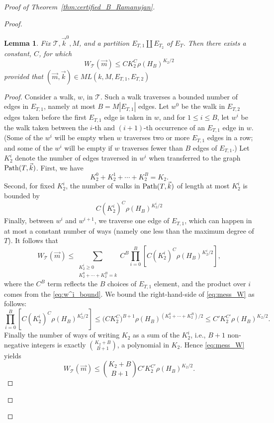 \documentclass{memo-l}
\theoremstyle{plain}
\theoremstyle{definition}
\numberwithin{section}{chapter}
\numberwithin{equation}{chapter}
\theoremstyle{plain}
\newtheorem{lem}[theorem]{Lemma}
\theoremstyle{definition}
\newcommand\cT{\mathcal{T}}
\begin{document}
\begin{proof}[Proof of Theorem~\ref{thm:certified_B_Ramanujan}]
\begin{proof}
\begin{lem}\label{le:crucial_walk_bound}
Fix $\cT,\vec k^0,M$, and a partition $E_{T,1}\amalg E_{T_2}$
of $E_T$.  Then there exists a constant, $C$, for which $$ W_\cT(\vec m)
\leq C K_2^C \rho(H_B)^{K_2/2} $$ provided that $(\vec m,\vec k)\in
ML(k,M,E_{T,1},E_{T,2})$ \end{lem} \begin{proof} Consider a walk, $w$, in
$\cT$.  Such a walk traverses a bounded number of edges in $E_{T,1}$,
namely at most $B=M |E_{T,1}|$ edges.  Let $w^0$ be the walk in $E_{T,2}$
edges taken before the first $E_{T,1}$ edge is taken in $w$, and for $1\leq
i\leq B$, let $w^i$ be the walk taken between the $i$-th and $(i+1)$-th
occurrence of an $E_{T,1}$ edge in $w$.  (Some of the $w^i$ will be empty
when $w$ traverses two or more $E_{T,1}$ edges in a row; and some of the
$w^i$ will be empty if $w$ traverses fewer than $B$ edges of $E_{T,1}$.)
Let $K_2^i$ denote the number of edges traversed in $w^i$ when transferred
to the graph ${\rm Path}(T,\vec k)$.  First, we have $$ K_2^0 + K_2^1 +
\cdots  + K_2^B  = K_2.  $$ Second, for fixed $K_2^i$, the number of walks
in ${\rm Path}(T,\vec k)$ of length at most $K_2^i$ is bounded by
\begin{equation}\label{eq:w^i_bound} C (K_2^i)^C \rho(H_B)^{K_2^i/2}
\end{equation} Finally, between $w^i$ and $w^{i+1}$, we traverse one edge
of $E_{T,1}$, which can happen in at most a constant number of ways (namely
one less than the maximum degree of $T$).  It follows that
\begin{equation}\label{eq:mess_W} W_\cT(\vec m) \leq \sum_{\substack{
K_2^i\geq 0 \\ K_2^0+\cdots+K_2^B = k} } C^B \prod_{i=0}^B [ C(K_2^i)^C
\rho(H_B)^{K_2^i/2} ] , \end{equation} where the $C^B$ term reflects the $B$
choices of $E_{T,1}$ element, and the product over $i$ comes from the
\eqref{eq:w^i_bound}.  We bound the right-hand-side of \eqref{eq:mess_W} as
follows: $$ \prod_{i=0}^B [ C(K_2^i)^C \rho(H_B)^{K_2^i/2} ] \leq \bigl( CK_2^C
\bigr)^{B+1} \rho(H_B)^{(K_2^0+\cdots+K_2^B)/2} \leq C' K_2^{C'} \rho(H_B)^{K_2/2}
.  $$ Finally the number of ways of writing $K_2$ as a sum of the $K_2^i$,
i.e., $B+1$ non-negative integers is exactly $\binom{K_2+B}{B+1}$, a
polynomial in $K_2$.  Hence \eqref{eq:mess_W} yields $$ W_\cT(\vec m) \le
\binom{K_2+B}{B+1} C' K_2^{C'} \rho(H_B)^{K_2/2}.  $$ \end{proof}


\end{proof}
\end{proof}
\end{document}
